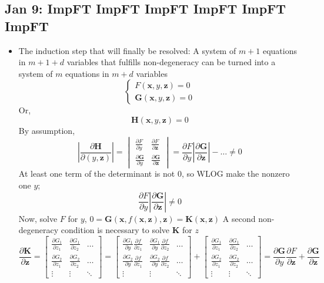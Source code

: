 \documentclass[10pt, oneside]{article}
\newcommand{\del}{\partial}
\renewcommand{\vec}[1]{\mathbf{#1}}
\newcommand{\vecf}[1]{\boldsymbol{#1}}
\begin{document}
\subsection{Jan 9: ImpFT ImpFT ImpFT ImpFT ImpFT ImpFT}
\begin{itemize}
    \item The induction step that will finally be resolved: A system of $m+1$ equations in $m + 1 + d$ variables that fulfills non-degeneracy can be turned into a system of $m$ equations in $m + d$ variables
    \[\begin{cases}
    F(\vec{x},y,\vec{z}) = 0\\
    \vecf{G}(\vec{x},y,\vec{z}) = 0
    \end{cases}\]
    Or,
    \[\vecf{H}(\vec{x},y,\vec{z}) = 0\]
    By assumption,
    \[\left|\frac{\del \vecf{H}}{\del (y,\vec{z})}\right| = 
    \begin{vmatrix}
        \frac{\del F}{\del y} & \frac{\del F}{\del \vec{z}}\\
        \frac{\del \vecf{G}}{\del y} & \frac{\del \vecf{G}}{\del \vec{z}}
    \end{vmatrix} =
    \frac{\del F}{\del y} \left| \frac{\del \vecf{G}}{\del \vec{z}} \right| - \hdots \neq 0\]
    At least one term of the determinant is not $0$, so WLOG make the nonzero one $y$; 
    \[\frac{\del F}{\del y} \left| \frac{\del \vecf{G}}{\del \vec{z}} \right| \neq 0\]
    Now, solve $F$ for $y$, $0 = \vecf{G}(\vec{x},f(\vec{x},\vec{z}),\vec{z}) = \vecf{K}(\vec{x},\vec{z})$
    A second non-degeneracy condition is necessary to solve $\vecf{K}$ for $z$
    \[\frac{\del \vecf{K}}{\del \vec{z}} =
    \begin{bmatrix}
        \frac{\del G_1}{\del z_1} & \frac{\del G_1}{\del z_2} & \hdots\\
        \frac{\del G_2}{\del z_1} & \frac{\del G_2}{\del z_2} & \hdots\\
        \vdots & \vdots & \ddots
    \end{bmatrix} = 
    \begin{bmatrix}
        \frac{\del G_1}{\del y} \frac{\del f}{\del z_1} & \frac{\del G_1}{\del y} \frac{\del f}{\del z_2} & \hdots\\
        \frac{\del G_2}{\del y} \frac{\del f}{\del z_1} & \frac{\del G_2}{\del y} \frac{\del f}{\del z_2} & \hdots\\
        \vdots & \vdots & \ddots
    \end{bmatrix} +
    \begin{bmatrix}
        \frac{\del G_1}{\del z_1} & \frac{\del G_1}{\del z_2} & \hdots\\
        \frac{\del G_2}{\del z_1} & \frac{\del G_2}{\del z_2} & \hdots\\
        \vdots & \vdots & \ddots
    \end{bmatrix} =
     \frac{\del \vecf{G}}{\del y} \frac{\del F}{\del \vec{z}} + \frac{\del \vecf{G}}{\del \vec{z}}\]
\end{itemize}
\end{document}
